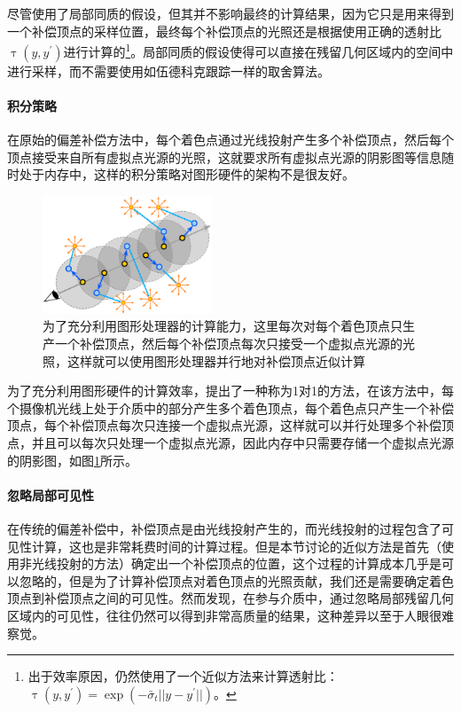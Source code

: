 尽管使用了局部同质的假设，但其并不影响最终的计算结果，因为它只是用来得到一个补偿顶点的采样位置，最终每个补偿顶点的光照还是根据使用正确的透射比$\uptau(y,y^{'})$进行计算的\footnote{出于效率原因，\cite{a:ApproximateBiasCompensationforRenderingSceneswithHeterogeneousParticipatingMedia}仍然使用了一个近似方法来计算透射比：$\uptau(y,y^{'})=\exp(-\bar{\sigma}_t||y-y^{'}||)$。}。局部同质的假设使得可以直接在残留几何区域内的空间中进行采样，而不需要使用如伍德科克跟踪一样的取舍算法。



\paragraph{积分策略}
在原始的偏差补偿方法中，每个着色点通过光线投射产生多个补偿顶点，然后每个顶点接受来自所有虚拟点光源的光照，这就要求所有虚拟点光源的阴影图等信息随时处于内存中，这样的积分策略对图形硬件的架构不是很友好。

\begin{figure}
	\sidecaption
	\includegraphics[width=0.45\textwidth]{figures/ir/connection-strategies}
	\caption{为了充分利用图形处理器的计算能力，这里每次对每个着色顶点只生产一个补偿顶点，然后每个补偿顶点每次只接受一个虚拟点光源的光照，这样就可以使用图形处理器并行地对补偿顶点近似计算}
	\label{f:connection-strategies}
\end{figure}

为了充分利用图形硬件的计算效率，\cite{a:ApproximateBiasCompensationforRenderingSceneswithHeterogeneousParticipatingMedia}提出了一种称为1对1的方法，在该方法中，每个摄像机光线上处于介质中的部分产生多个着色顶点，每个着色点只产生一个补偿顶点，每个补偿顶点每次只连接一个虚拟点光源，这样就可以并行处理多个补偿顶点，并且可以每次只处理一个虚拟点光源，因此内存中只需要存储一个虚拟点光源的阴影图，如图\ref{f:connection-strategies}所示。



\paragraph{忽略局部可见性}
在传统的偏差补偿中，补偿顶点是由光线投射产生的，而光线投射的过程包含了可见性计算，这也是非常耗费时间的计算过程。但是本节讨论的近似方法是首先（使用非光线投射的方法）确定出一个补偿顶点的位置，这个过程的计算成本几乎是可以忽略的，但是为了计算补偿顶点对着色顶点的光照贡献，我们还是需要确定着色顶点到补偿顶点之间的可见性。然而\cite{a:ApproximateBiasCompensationforRenderingSceneswithHeterogeneousParticipatingMedia}发现，在参与介质中，通过忽略局部残留几何区域内的可见性，往往仍然可以得到非常高质量的结果，这种差异以至于人眼很难察觉。




